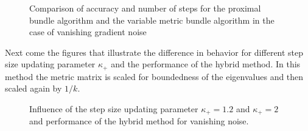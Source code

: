 \vspace{-1.5em}

\begin{figure}[H]
	\begin{subfigure}{0.49\textwidth}
	\end{subfigure}
	\begin{subfigure}{0.49\textwidth}
	\end{subfigure}
	\caption[Accuracy and number of steps: vanishing gradient noise, higher dimensions]{Comparison of accuracy and number of steps for the proximal bundle algorithm and the variable metric bundle algorithm in the case of vanishing gradient noise}%
	\label{fig_van_grad_noise_large}%
\end{figure}

Next come the figures that illustrate the difference in behavior for different step size updating parameter \(\kappa_+\) and the performance of the hybrid method. In this method the metric matrix is scaled for boundedness of the eigenvalues and then scaled again by \(1/k\).


%

\begin{figure}[H]
	\begin{subfigure}{0.49\textwidth}
	\end{subfigure}
	\begin{subfigure}{0.49\textwidth}
	\end{subfigure}
	\caption[Influence of the step size updating parameter and hybrid method: vanishing noise]{Influence of the step size updating parameter \(\kappa_+ = 1.2\) and \(\kappa_+ =2 \) and performance of the hybrid method for vanishing noise.}%
	\label{fig_van_noise_comp}%
\end{figure}

